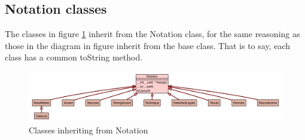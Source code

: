 \begin{appendices}
\begin{landscape}
\subsection{Notation classes}
The classes in figure \ref{fig:notation} inherit from the Notation class, for the same reasoning as those in the diagram in figure \label{fig:base} inherit from the base class. That is to say, each class has a common toString method.
\begin{figure}[h]
\includegraphics[width=700pt]{diagrams/jpegs/uml_class_diagram_for_implemen_34}	
\caption{Classes inheriting from Notation}
\label{fig:notation}
\end{figure}
\end{landscape}


\end{appendices}
